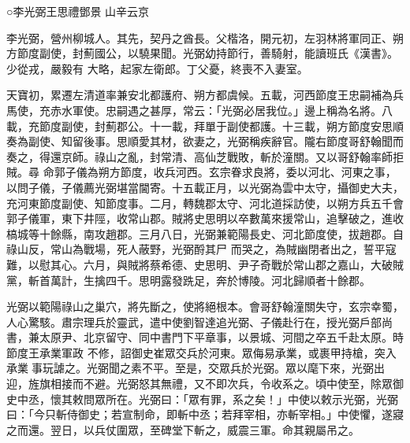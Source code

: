 
\begin{pinyinscope}

 ○李光弼王思禮鄧景
 山辛云京



 李光弼，營州柳城人。其先，契丹之酋長。父楷洛，開元初，左羽林將軍同正、朔方節度副使，封薊國公，以驍果聞。光弼幼持節行，善騎射，能讀班氏《漢書》。少從戎，嚴毅有
 大略，起家左衛郎。丁父憂，終喪不入妻室。



 天寶初，累遷左清道率兼安北都護府、朔方都虞候。五載，河西節度王忠嗣補為兵馬使，充赤水軍使。忠嗣遇之甚厚，常云：「光弼必居我位。」邊上稱為名將。八載，充節度副使，封薊郡公。十一載，拜單于副使都護。十三載，朔方節度安思順奏為副使、知留後事。思順愛其材，欲妻之，光弼稱疾辭官。隴右節度哥舒翰聞而奏之，得還京師。祿山之亂，封常清、高仙芝戰敗，斬於潼關。又以哥舒翰率師拒賊。尋
 命郭子儀為朔方節度，收兵河西。玄宗眷求良將，委以河北、河東之事，以問子儀，子儀薦光弼堪當閫寄。十五載正月，以光弼為雲中太守，攝御史大夫，充河東節度副使、知節度事。二月，轉魏郡太守、河北道採訪使，以朔方兵五千會郭子儀軍，東下井陘，收常山郡。賊將史思明以卒數萬來援常山，追擊破之，進收槁城等十餘縣，南攻趙郡。三月八日，光弼兼範陽長史、河北節度使，拔趙郡。自祿山反，常山為戰場，死人蔽野，光弼酹其尸
 而哭之，為賊幽閉者出之，誓平寇難，以慰其心。六月，與賊將蔡希德、史思明、尹子奇戰於常山郡之嘉山，大破賊黨，斬首萬計，生擒四千。思明露發跣足，奔於博陵。河北歸順者十餘郡。



 光弼以範陽祿山之巢穴，將先斷之，使將絕根本。會哥舒翰潼關失守，玄宗幸蜀，人心驚駭。肅宗理兵於靈武，遣中使劉智達追光弼、子儀赴行在，授光弼戶部尚書，兼太原尹、北京留守、同中書門下平章事，以景城、河間之卒五千赴太原。時節度王承業軍政
 不修，詔御史崔眾交兵於河東。眾侮易承業，或裹甲持槍，突入承業事玩謔之。光弼聞之素不平。至是，交眾兵於光弼。眾以麾下來，光弼出迎，旌旗相接而不避。光弼怒其無禮，又不即次兵，令收系之。頃中使至，除眾御史中丞，懷其敕問眾所在。光弼曰：「眾有罪，系之矣！」中使以敕示光弼，光弼曰：「今只斬侍御史；若宣制命，即斬中丞；若拜宰相，亦斬宰相。」中使懼，遂寢之而還。翌日，以兵仗圍眾，至碑堂下斬之，威震三軍。命其親屬吊之。




\end{pinyinscope}
